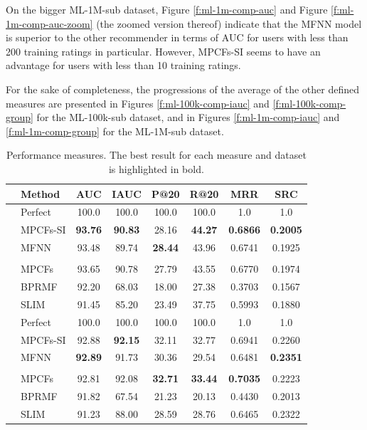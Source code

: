 On the bigger ML-1M-sub dataset, Figure \ref{f:ml-1m-comp-auc} and Figure \ref{f:ml-1m-comp-auc-zoom} (the zoomed version thereof) indicate that the MFNN model is superior to the other recommender in terms of AUC for users with less than 200 training ratings in particular.
However, MPCFs-SI seems to have an advantage for users with less than 10 training ratings.

For the sake of completeness, the progressions of the average of the other defined measures are presented in Figures \ref{f:ml-100k-comp-iauc} and \ref{f:ml-100k-comp-group} for the ML-100k-sub dataset, and in Figures \ref{f:ml-1m-comp-iauc} and \ref{f:ml-1m-comp-group} for the ML-1M-sub dataset.
\begin{table}[p]
	\begin{center}
		\begin{tabularx}{\linewidth}{cXcccccc}
			\hline \hline
			& \textbf{Method} & \textbf{AUC} & \textbf{IAUC} & \textbf{P@20} & \textbf{R@20} & \textbf{MRR} & \textbf{SRC}\\
			\hline
			\parbox[t]{2mm}{} & Perfect & 100.0 & 100.0 & 100.0 & 100.0 & 1.0 & 1.0\\
			& MPCFs-SI & \textbf{93.76} & \textbf{90.83} & 28.16 & \textbf{44.27} & \textbf{0.6866} & \textbf{0.2005}\\
			& MFNN & 93.48 & 89.74 & \textbf{28.44} & 43.96 & 0.6741 & 0.1925 \\
			&  \\
			& MPCFs & 93.65 & 90.78 & 27.79 & 43.55 & 0.6770 & 0.1974 \\
			& BPRMF & 92.20 & 68.03 & 18.00 & 27.38 & 0.3703 & 0.1567 \\
			& SLIM & 91.45 & 85.20 & 23.49 & 37.75 & 0.5993 & 0.1880 \\
			\hline
			\parbox[t]{2mm}{} & Perfect & 100.0 & 100.0 & 100.0 & 100.0 & 1.0 & 1.0\\
			& MPCFs-SI & 92.88 & \textbf{92.15} & 32.11 & 32.77 & 0.6941 & 0.2260 \\
			& MFNN & \textbf{92.89} & 91.73 & 30.36 & 29.54 & 0.6481 & \textbf{0.2351} \\
			&  \\
			& MPCFs & 92.81 & 92.08 & \textbf{32.71} & \textbf{33.44} & \textbf{0.7035} & 0.2223 \\
			& BPRMF & 91.82 & 67.54 & 21.23 & 20.13 & 0.4430 & 0.2013 \\
			& SLIM & 91.23 & 88.00 & 28.59 & 28.76 & 0.6465 &  0.2322 \\
			\hline \hline
		\end{tabularx}
	\end{center}
	\caption{Performance measures. The best result for each measure and dataset is highlighted in bold.}
	\label{tab:performance}
\end{table}


